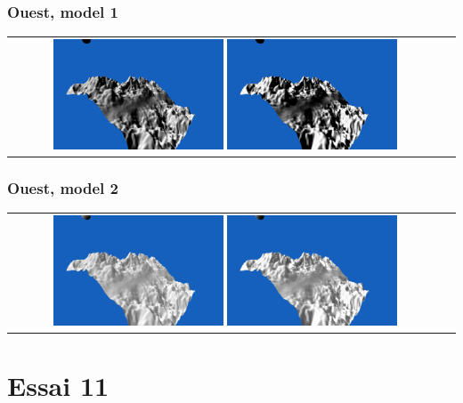 \documentclass[a4paper]{article}
\begin{document}
\subsubsection{Ouest, model 1}
\begin{tabular}{cc}
\includegraphics[width=0.4\textwidth]{Images/Essais/Essai_10_phong_West_0.png}
\includegraphics[width=0.4\textwidth]{Images/Essais/Essai_10_slint_West_0.png}
\end{tabular}
\subsubsection{Ouest, model 2}
\begin{tabular}{cc}
\includegraphics[width=0.4\textwidth]{Images/Essais/Essai_10_phong_West_1.png}
\includegraphics[width=0.4\textwidth]{Images/Essais/Essai_10_slint_West_1.png}
\end{tabular}



\section{Essai 11}
\end{document}
